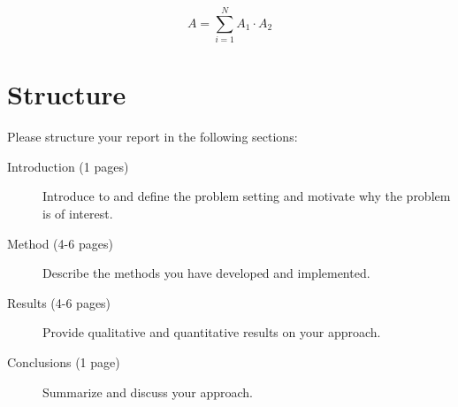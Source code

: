 \documentclass[twoside,a4paper,article]{combine}
\begin{document}
\begin{equation}
A = \sum_{i=1}^N A_1 \cdot A_2
\end{equation}

\section{Structure}

Please structure your report in the following sections:
\begin{description}
	\item[Introduction (1 pages)] Introduce to and define the problem setting and motivate why the problem is of interest.
	\item[Method (4-6 pages)] Describe the methods you have developed and implemented.
	\item[Results (4-6 pages)] Provide qualitative and quantitative results on your approach.
	\item[Conclusions (1 page)] Summarize and discuss your approach.
\end{description}






\end{document}
